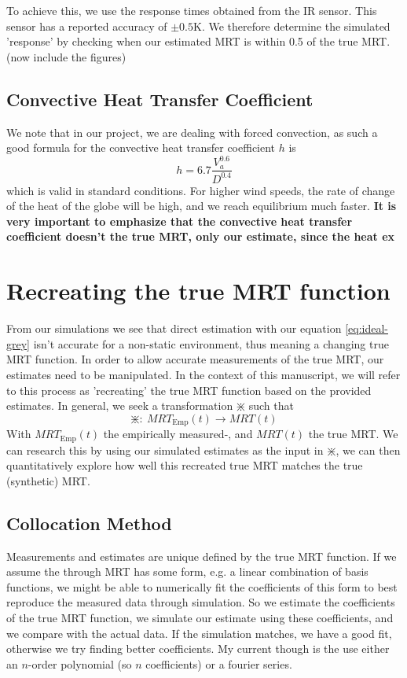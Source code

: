 \documentclass[]{scrartcl}
\begin{document}
To achieve this, we use the response times obtained from the IR sensor. This sensor has a reported accuracy of $\pm 0.5\unit{\kelvin}$. We therefore determine the simulated 'response' by checking when our estimated MRT is within 0.5 of the true MRT. (now include the figures)

\subsection{Convective Heat Transfer Coefficient}
We note that in our project, we are dealing with forced convection, as such a good formula for the convective heat transfer coefficient $h$ is
$$
h = 6.7\frac{V_a^{0.6}}{D^{0.4}}
$$
which is valid in standard conditions. For higher wind speeds, the rate of change of the heat of the globe will be high, and we reach equilibrium much faster. \textbf{It is very important to emphasize that the convective heat transfer coefficient doesn't the true MRT, only our estimate, since the heat ex}
\section{Recreating the true MRT function}

From our simulations we see that direct estimation with our equation \eqref{eq:ideal-grey} isn't accurate for a non-static environment, thus meaning a changing true MRT function. In order to allow accurate measurements of the true MRT, our estimates need to be manipulated. In the context of this manuscript, we will refer to this process as 'recreating' the true MRT function based on the provided estimates. In general, we seek a transformation $\divideontimes$ such that
$$
 \divideontimes: \: MRT_{\text{Emp}}(t) \rightarrow MRT(t)
$$
With $MRT_{\text{Emp}}(t)$ the empirically measured-, and $MRT(t)$ the true MRT. We can research this by using our simulated estimates as the input in $\divideontimes$, we can then quantitatively explore how well this recreated true MRT matches the true (synthetic) MRT.

\subsection{Collocation Method}
Measurements and estimates are unique defined by the true MRT function. If we assume the through MRT has some form, e.g. a linear combination of basis functions, we might be able to numerically fit the coefficients of this form to best reproduce the measured data through simulation. So we estimate the coefficients of the true MRT function, we simulate our estimate using these coefficients, and we compare with the actual data. If the simulation matches, we have a good fit, otherwise we try finding better coefficients. My current though is the use either an $n$-order polynomial (so $n$ coefficients) or a fourier series.
\end{document}
